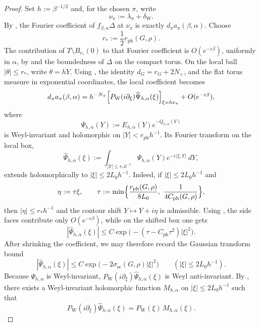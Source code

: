 \begin{proof}
Set $h:=\beta^{-1/2}$ and, for the chosen $\pi$, write
\[
\nu_\pi:=\lambda_\pi+\delta_{\mathrm W}.
\]
By , the Fourier coefficient of $f_{\beta,\alpha}\Delta$ at $\nu_\pi$ is exactly $d_\pi a_\pi(\beta,\alpha)$.
Choose
\[
r_*:=\frac12 r_{\mathrm{ph}}(G,\rho).
\]
The contribution of $T\setminus B_{r_*}(0)$ to that Fourier coefficient is $O(e^{-c\beta})$, uniformly in $\alpha$, by  and the boundedness of $\Delta$ on the compact torus.
On the local ball $|\theta|\le r_*$, write $\theta=hY$.
Using , the identity $d_G=r_G+2N_+$, and the flat torus measure in exponential coordinates, the local coefficient becomes
\begin{equation}\label{eq:A1_low_local_fourier_repr}
d_\pi a_\pi(\beta,\alpha)
=
h^{-N_+}\Bigl[P_{\mathrm W}(i\partial_\xi)\widehat\Psi_{h,\alpha}(\xi)\Bigr]_{\xi=h\nu_\pi}
+O(e^{-c\beta}),
\end{equation}
where
\[
\Psi_{h,\alpha}(Y):=E_{h,\alpha}(Y)e^{-Q_{h,\alpha}(Y)}
\]
is Weyl-invariant and holomorphic on $|Y|<r_{\mathrm{ph}}h^{-1}$.
Its Fourier transform on the local box,
\[
\widehat\Psi_{h,\alpha}(\xi)
:=
\int_{|Y|\le r_*h^{-1}}\Psi_{h,\alpha}(Y)e^{-i\langle \xi,Y\rangle}\,dY,
\]
extends holomorphically to $|\xi|\le 2L_0h^{-1}$.
Indeed, if $|\xi|\le 2L_0h^{-1}$ and
\[
\eta:=\tau\xi,
\qquad
\tau:=\min\Bigl\{\frac{r_{\mathrm{ph}}(G,\rho)}{8L_0},\ \frac{1}{4C_{\mathrm{ph}}(G,\rho)}\Bigr\},
\]
then $|\eta|\le r_*h^{-1}$ and the contour shift $Y\mapsto Y+i\eta$ is admissible.
Using , the side faces contribute only $O(e^{-c\beta})$, while on the shifted box one gets
\[
|\widehat\Psi_{h,\alpha}(\xi)|
\le
C\exp\!\bigl(-(\tau-C_{\mathrm{ph}}\tau^2)|\xi|^2\bigr).
\]
After shrinking the coefficient, we may therefore record the Gaussian transform bound
\[
|\widehat\Psi_{h,\alpha}(\xi)|
\le
C\exp\!\bigl(-2\sigma_{\mathrm{sc}}(G,\rho)|\xi|^2\bigr)
\qquad (|\xi|\le 2L_0h^{-1}).
\]
Because $\Psi_{h,\alpha}$ is Weyl-invariant, $P_{\mathrm W}(i\partial_\xi)\widehat\Psi_{h,\alpha}(\xi)$ is Weyl anti-invariant.
By , there exists a Weyl-invariant holomorphic function $M_{h,\alpha}$ on $|\xi|\le 2L_0h^{-1}$ such that
\begin{equation}\label{eq:A1_low_multiplier_factorization}
P_{\mathrm W}(i\partial_\xi)\widehat\Psi_{h,\alpha}(\xi)
=
P_{\mathrm W}(\xi)\,M_{h,\alpha}(\xi).
\end{equation}

\end{proof}
